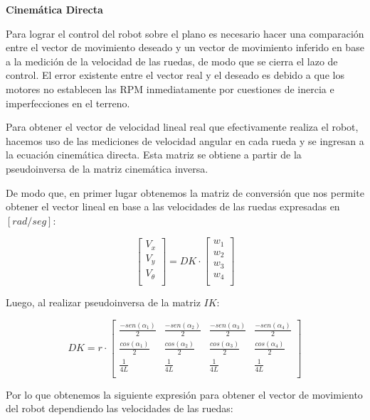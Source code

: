 \textbf{Cinemática Directa} \mbox{} \vspace{8pt}

Para lograr el control del robot sobre el plano es necesario hacer una comparación entre el vector de movimiento deseado y un vector de movimiento inferido en base a la medición de la velocidad de las ruedas, de modo que se cierra el lazo de control. El error existente entre el vector real y el deseado es debido a que los motores no establecen las RPM inmediatamente por cuestiones de inercia e imperfecciones en el terreno.

Para obtener el vector de velocidad lineal real que efectivamente realiza el robot, hacemos uso de las mediciones de velocidad angular en cada rueda y se ingresan a la ecuación cinemática directa. Esta matriz se obtiene a partir de la pseudoinversa de la matriz cinemática inversa. \cite{islassistcontrolomni}

De modo que, en primer lugar obtenemos la matriz de conversión que nos permite obtener el vector lineal en base a las velocidades de las ruedas expresadas en $[rad/seg]$:

$$ \begin{bmatrix} V_x \\ V_y \\ V_\theta \\ \end{bmatrix} = DK \cdot \begin{bmatrix} w_1 \\ w_2 \\ w_3 \\ w_4 \\ \end{bmatrix} $$

Luego, al realizar pseudoinversa de la matriz $IK$:

$$  DK = 
    r
    \cdot 
    \begin{bmatrix}
        {\frac{-sen(\alpha_1)}{2}} & {\frac{-sen(\alpha_2)}{2}} & {\frac{-sen(\alpha_3)}{2}} & {\frac{-sen(\alpha_4)}{2}} \\
        {\frac{cos(\alpha_1)}{2}}  & {\frac{cos(\alpha_2)}{2}}  & {\frac{cos(\alpha_3)}{2}}  & {\frac{cos(\alpha_4)}{2}}  \\
        {\frac{1}{4L}}  & {\frac{1}{4L}}  & {\frac{1}{4L}}  & {\frac{1}{4L}}  \\
    \end{bmatrix} $$

Por lo que obtenemos la siguiente expresión para obtener el vector de movimiento del robot dependiendo las velocidades de las ruedas:

